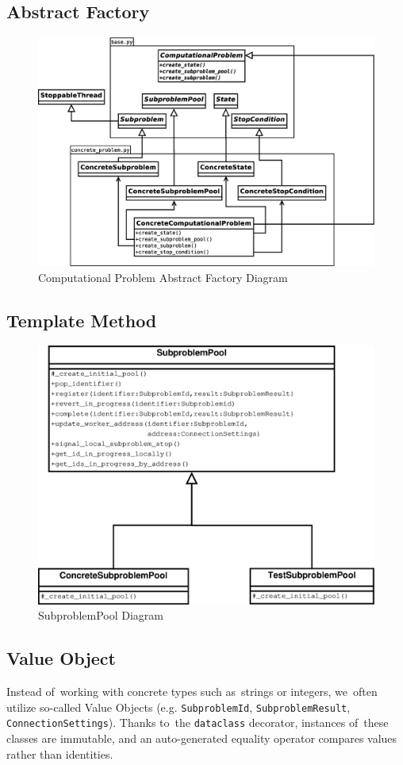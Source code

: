 \documentclass{article}
\begin{document}
\subsection{Abstract Factory}
\begin{figure}[H]
	\centering
	\includegraphics[width=\linewidth]{../diagrams/FactoryDiagram.eps}
	\caption{Computational Problem Abstract Factory Diagram}
\end{figure}

\subsection{Template Method}
\begin{figure}[H]
	\centering
	 \includegraphics[width=.6\linewidth]{../diagrams/SubproblemPoolDiagram.eps}
	\caption{SubproblemPool Diagram}
\end{figure}

\subsection{Value Object}
Instead of~working with concrete types such as~strings or integers, we~often utilize so-called Value Objects (e.g. \texttt{SubproblemId}, \texttt{SubproblemResult}, \texttt{ConnectionSettings}). Thanks to~the \texttt{dataclass} decorator, instances of~these classes are immutable, and an auto-generated equality operator compares values rather than identities.
\end{document}
